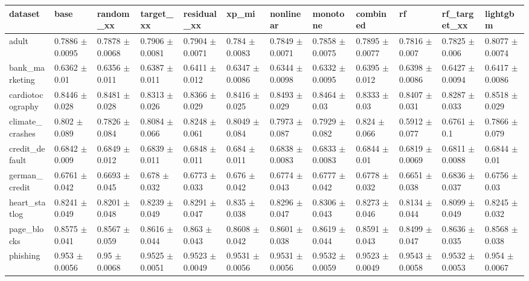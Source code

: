 \begin{tabular}{llllllllllll}
\toprule
dataset & base & random\_xx & target\_xx & residual\_xx & xp\_mi & nonlinear & monotone & combined & rf & rf\_target\_xx & lightgbm \\
\midrule
adult & 0.7886 $\pm$ 0.0095 & 0.7878 $\pm$ 0.0068 & 0.7906 $\pm$ 0.0081 & 0.7904 $\pm$ 0.0071 & 0.784 $\pm$ 0.0083 & 0.7849 $\pm$ 0.0071 & 0.7858 $\pm$ 0.0075 & 0.7895 $\pm$ 0.0077 & 0.7816 $\pm$ 0.007 & 0.7825 $\pm$ 0.006 & 0.8077 $\pm$ 0.0074 \\
bank\_marketing & 0.6362 $\pm$ 0.01 & 0.6356 $\pm$ 0.011 & 0.6387 $\pm$ 0.011 & 0.6411 $\pm$ 0.012 & 0.6347 $\pm$ 0.0086 & 0.6344 $\pm$ 0.0098 & 0.6332 $\pm$ 0.0095 & 0.6395 $\pm$ 0.012 & 0.6398 $\pm$ 0.0086 & 0.6427 $\pm$ 0.0094 & 0.6417 $\pm$ 0.0086 \\
cardiotocography & 0.8446 $\pm$ 0.028 & 0.8481 $\pm$ 0.028 & 0.8313 $\pm$ 0.026 & 0.8366 $\pm$ 0.029 & 0.8416 $\pm$ 0.025 & 0.8493 $\pm$ 0.029 & 0.8464 $\pm$ 0.03 & 0.8333 $\pm$ 0.03 & 0.8407 $\pm$ 0.031 & 0.8287 $\pm$ 0.033 & 0.8518 $\pm$ 0.029 \\
climate\_crashes & 0.802 $\pm$ 0.089 & 0.7826 $\pm$ 0.084 & 0.8084 $\pm$ 0.066 & 0.8248 $\pm$ 0.061 & 0.8049 $\pm$ 0.084 & 0.7973 $\pm$ 0.087 & 0.7929 $\pm$ 0.082 & 0.824 $\pm$ 0.066 & 0.5912 $\pm$ 0.077 & 0.6761 $\pm$ 0.1 & 0.7866 $\pm$ 0.079 \\
credit\_default & 0.6842 $\pm$ 0.009 & 0.6849 $\pm$ 0.012 & 0.6839 $\pm$ 0.011 & 0.6848 $\pm$ 0.011 & 0.684 $\pm$ 0.011 & 0.6838 $\pm$ 0.0083 & 0.6833 $\pm$ 0.0083 & 0.6844 $\pm$ 0.01 & 0.6819 $\pm$ 0.0069 & 0.6811 $\pm$ 0.0088 & 0.6844 $\pm$ 0.01 \\
german\_credit & 0.6761 $\pm$ 0.042 & 0.6693 $\pm$ 0.045 & 0.678 $\pm$ 0.032 & 0.6773 $\pm$ 0.033 & 0.676 $\pm$ 0.042 & 0.6774 $\pm$ 0.043 & 0.6777 $\pm$ 0.042 & 0.6778 $\pm$ 0.032 & 0.6651 $\pm$ 0.038 & 0.6836 $\pm$ 0.037 & 0.6756 $\pm$ 0.03 \\
heart\_statlog & 0.8241 $\pm$ 0.049 & 0.8201 $\pm$ 0.048 & 0.8239 $\pm$ 0.049 & 0.8291 $\pm$ 0.047 & 0.835 $\pm$ 0.038 & 0.8296 $\pm$ 0.047 & 0.8306 $\pm$ 0.043 & 0.8273 $\pm$ 0.046 & 0.8134 $\pm$ 0.044 & 0.8099 $\pm$ 0.049 & 0.8245 $\pm$ 0.032 \\
page\_blocks & 0.8575 $\pm$ 0.041 & 0.8567 $\pm$ 0.059 & 0.8616 $\pm$ 0.044 & 0.863 $\pm$ 0.043 & 0.8608 $\pm$ 0.042 & 0.8601 $\pm$ 0.038 & 0.8619 $\pm$ 0.044 & 0.8591 $\pm$ 0.043 & 0.8499 $\pm$ 0.047 & 0.8636 $\pm$ 0.035 & 0.8568 $\pm$ 0.038 \\
phishing & 0.953 $\pm$ 0.0056 & 0.95 $\pm$ 0.0068 & 0.9525 $\pm$ 0.0051 & 0.9523 $\pm$ 0.0049 & 0.9531 $\pm$ 0.0056 & 0.9531 $\pm$ 0.0056 & 0.9532 $\pm$ 0.0059 & 0.9523 $\pm$ 0.0049 & 0.9543 $\pm$ 0.0058 & 0.9532 $\pm$ 0.0053 & 0.954 $\pm$ 0.0067 \\

\end{tabular}
